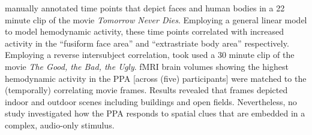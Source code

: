 \documentclass[english]{article}
\begin{document}
\citep{bartels2004mapping} manually annotated time points that depict faces and human bodies in a 22 minute clip of the movie \textit{Tomorrow Never Dies}.
Employing a general linear model to model hemodynamic activity, these time points correlated with increased activity in the ``fusiform face area'' \citep{kanwisher1997ffa} and ``extrastriate body area'' \citep{downing2001bodyarea} respectively. Employing a reverse intersubject correlation, \citep{hasson2004intersubject} took used a 30 minute clip of the movie \textit{The Good, the Bad, the Ugly}.
fMRI brain volumes showing the highest hemodynamic activity in the PPA [across (five) participants] were matched to the (temporally) correlating movie frames.
Results revealed that frames depicted indoor and outdoor scenes including buildings and open fields.
Nevertheless, no study investigated how the PPA responds to spatial clues that are embedded in a complex, audio-only stimulus.

\end{document}
